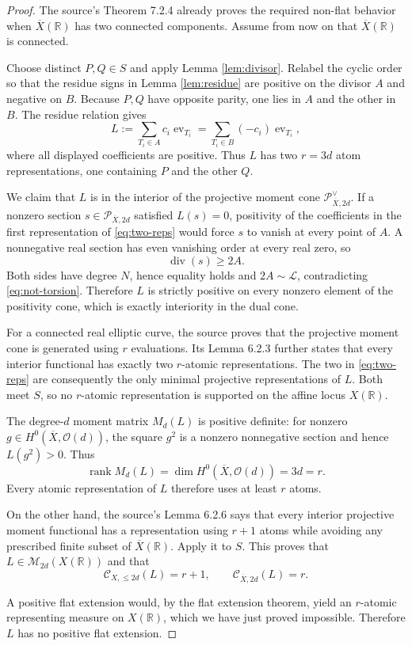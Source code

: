 \documentclass[11pt]{article}
\newcommand{\R}{\mathbb{R}}
\newcommand{\cL}{\mathcal{L}}
\newcommand{\Pos}{\mathcal{P}}
\newcommand{\Mom}{\mathcal{M}}
\newcommand{\ev}{\operatorname{ev}}
\newcommand{\car}{\mathcal{C}}
\begin{document}
\begin{proof}
The source's Theorem 7.2.4 already proves the required non-flat behavior
when $\overline X(\R)$ has two connected components. Assume from now on
that $\overline X(\R)$ is connected.

Choose distinct $P,Q\in S$ and apply Lemma \ref{lem:divisor}. Relabel the
cyclic order so that the residue signs in Lemma \ref{lem:residue} are
positive on the divisor $A$ and negative on $B$. Because $P,Q$ have
opposite parity, one lies in $A$ and the other in $B$. The residue
relation gives
\begin{equation}\label{eq:two-reps}
 L:=\sum_{T_i\in A}c_i\ev_{T_i}
   =\sum_{T_i\in B}(-c_i)\ev_{T_i},
\end{equation}
where all displayed coefficients are positive. Thus $L$ has two
$r=3d$ atom representations, one containing $P$ and the other $Q$.

We claim that $L$ is in the interior of the projective moment cone
$\Pos_{\overline X,2d}^{\vee}$. If a nonzero section
$s\in\Pos_{\overline X,2d}$ satisfied $L(s)=0$, positivity of the
coefficients in the first representation of \eqref{eq:two-reps} would
force $s$ to vanish at every point of $A$. A nonnegative real section
has even vanishing order at every real zero, so
\[
 \operatorname{div}(s)\geq2A.
\]
Both sides have degree $N$, hence equality holds and
$2A\sim\cL$, contradicting \eqref{eq:not-torsion}. Therefore $L$ is
strictly positive on every nonzero element of the positivity cone, which
is exactly interiority in the dual cone.

For a connected real elliptic curve, the source proves that the projective
moment cone is generated using $r$ evaluations. Its Lemma 6.2.3 further
states that every interior functional has exactly two $r$-atomic
representations. The two in \eqref{eq:two-reps} are consequently the only
minimal projective representations of $L$. Both meet $S$, so no
$r$-atomic representation is supported on the affine locus $X(\R)$.

The degree-$d$ moment matrix $M_d(L)$ is positive definite: for nonzero
$g\in H^0(\overline X,\mathcal O(d))$, the square $g^2$ is a nonzero
nonnegative section and hence $L(g^2)>0$. Thus
\[
 \operatorname{rank}M_d(L)
 =\dim H^0(\overline X,\mathcal O(d))=3d=r.
\]
Every atomic representation of $L$ therefore uses at least $r$ atoms.

On the other hand, the source's Lemma 6.2.6 says that every interior
projective moment functional has a representation using $r+1$ atoms while
avoiding any prescribed finite subset of $\overline X(\R)$. Apply it to
$S$. This proves that $L\in\Mom_{2d}(X(\R))$ and that
\[
 \car_{X,\leq2d}(L)=r+1,
 \qquad
 \car_{\overline X,2d}(L)=r.
\]

A positive flat extension would, by the flat extension theorem, yield an
$r$-atomic representing measure on $X(\R)$, which we have just proved
impossible. Therefore $L$ has no positive flat extension.
\end{proof}
\end{document}
